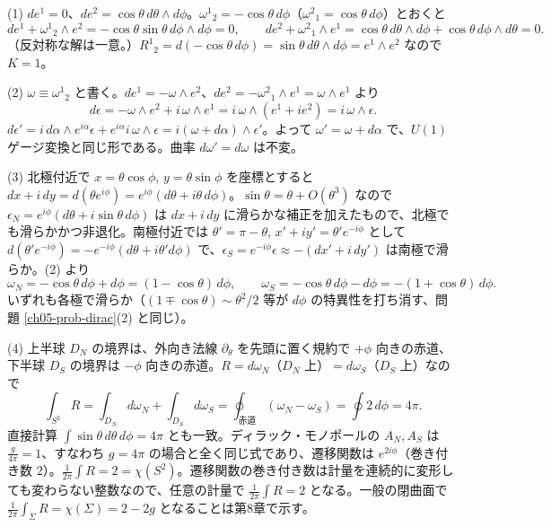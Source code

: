 \begin{solution}
(1) $de^1=0$、$de^2=\cos\theta\,d\theta\wedge d\phi$。$\omega^1{}_2=-\cos\theta\,d\phi$（$\omega^2{}_1=\cos\theta\,d\phi$）とおくと
\[
de^1+\omega^1{}_2\wedge e^2=-\cos\theta\sin\theta\,d\phi\wedge d\phi=0,\qquad
de^2+\omega^2{}_1\wedge e^1=\cos\theta\,d\theta\wedge d\phi+\cos\theta\,d\phi\wedge d\theta=0 .
\]
（反対称な解は一意。）$R^1{}_2=d(-\cos\theta\,d\phi)=\sin\theta\,d\theta\wedge d\phi=e^1\wedge e^2$ なので $K=1$。

(2) $\omega\equiv\omega^1{}_2$ と書く。$de^1=-\omega\wedge e^2$、$de^2=-\omega^2{}_1\wedge e^1=\omega\wedge e^1$ より
\[
d\epsilon=-\omega\wedge e^2+i\,\omega\wedge e^1=i\,\omega\wedge(e^1+ie^2)=i\,\omega\wedge\epsilon .
\]
$d\epsilon'=i\,d\alpha\wedge e^{i\alpha}\epsilon+e^{i\alpha}i\,\omega\wedge\epsilon=i(\omega+d\alpha)\wedge\epsilon'$。よって $\omega'=\omega+d\alpha$ で、$U(1)$ ゲージ変換と同じ形である。曲率 $d\omega'=d\omega$ は不変。

(3) 北極付近で $x=\theta\cos\phi$, $y=\theta\sin\phi$ を座標とすると $dx+i\,dy=d(\theta e^{i\phi})=e^{i\phi}(d\theta+i\theta\,d\phi)$。$\sin\theta=\theta+O(\theta^3)$ なので $\epsilon_N=e^{i\phi}(d\theta+i\sin\theta\,d\phi)$ は $dx+i\,dy$ に滑らかな補正を加えたもので、北極でも滑らかかつ非退化。南極付近では $\theta'=\pi-\theta$, $x'+iy'=\theta'e^{-i\phi}$ として $d(\theta'e^{-i\phi})=-e^{-i\phi}(d\theta+i\theta'd\phi)$ で、$\epsilon_S=e^{-i\phi}\epsilon\approx-(dx'+i\,dy')$ は南極で滑らか。(2) より
\[
\omega_N=-\cos\theta\,d\phi+d\phi=(1-\cos\theta)\,d\phi,\qquad\omega_S=-\cos\theta\,d\phi-d\phi=-(1+\cos\theta)\,d\phi .
\]
いずれも各極で滑らか（$(1\mp\cos\theta)\sim\theta^2/2$ 等が $d\phi$ の特異性を打ち消す、問題 \ref{ch05-prob-dirac}(2) と同じ）。

(4) 上半球 $D_N$ の境界は、外向き法線 $\partial_\theta$ を先頭に置く規約で $+\phi$ 向きの赤道、下半球 $D_S$ の境界は $-\phi$ 向きの赤道。$R=d\omega_N$（$D_N$ 上）$=d\omega_S$（$D_S$ 上）なので
\[
\int_{S^2}R=\int_{D_N}d\omega_N+\int_{D_S}d\omega_S=\oint_{\text{赤道}}(\omega_N-\omega_S)=\oint2\,d\phi=4\pi .
\]
直接計算 $\int\sin\theta\,d\theta\,d\phi=4\pi$ とも一致。ディラック・モノポールの $A_N,A_S$ は $\frac{g}{4\pi}=1$、すなわち $g=4\pi$ の場合と全く同じ式であり、遷移関数は $e^{2i\phi}$（巻き付き数 $2$）。$\frac1{2\pi}\int R=2=\chi(S^2)$。遷移関数の巻き付き数は計量を連続的に変形しても変わらない整数なので、任意の計量で $\frac1{2\pi}\int R=2$ となる。一般の閉曲面で $\frac1{2\pi}\int_\Sigma R=\chi(\Sigma)=2-2g$ となることは第8章で示す。
\end{solution}

